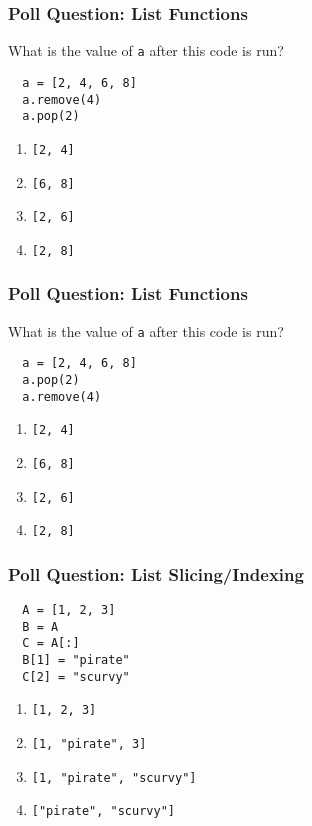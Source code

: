 \documentclass{beamer}
\begin{document}
%
%
\begin{frame}[fragile]
  \frametitle{Poll Question: List Functions}
  What is the value of \lstinline|a| after this code is run?
  \begin{lstlisting}
  a = [2, 4, 6, 8]
  a.remove(4)
  a.pop(2)
  \end{lstlisting}
  \vfill
  \begin{enumerate}[A]
    \item \lstinline|[2, 4]|
    \item \lstinline|[6, 8]|
    \item \lstinline|[2, 6]|
    \item \lstinline|[2, 8]|
  \end{enumerate}
\end{frame}

%
%
\begin{frame}[fragile]
  \frametitle{Poll Question: List Functions}
  What is the value of \lstinline|a| after this code is run?
  \begin{lstlisting}
  a = [2, 4, 6, 8]
  a.pop(2)
  a.remove(4)
  \end{lstlisting}
  \vfill
  \begin{enumerate}[A]
    \item \lstinline|[2, 4]|
    \item \lstinline|[6, 8]|
    \item \lstinline|[2, 6]|
    \item \lstinline|[2, 8]|
  \end{enumerate}
\end{frame}

%
%
\begin{frame}[fragile]
  \frametitle{Poll Question: List Slicing/Indexing}
  \begin{lstlisting}
  A = [1, 2, 3]
  B = A
  C = A[:]
  B[1] = "pirate"
  C[2] = "scurvy"
  \end{lstlisting}
  \vfill
  \begin{enumerate}[A]
    \item \lstinline|[1, 2, 3]|
    \item \lstinline|[1, "pirate", 3]|
    \item \lstinline|[1, "pirate", "scurvy"]|
    \item \lstinline|["pirate", "scurvy"]|
  \end{enumerate}
\end{frame}
\end{document}
